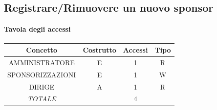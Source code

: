 \documentclass[a4paper,12pt]{report}
\begin{document}
\subsection{Registrare/Rimuovere un nuovo sponsor}
\begin{table}[H]
    \paragraph{Tavola degli accessi\newline}
    \begin{tabular}{|c|c|c|c|}
    \hline
    Concetto          & Costrutto & Accessi & Tipo \\ \hline
    AMMINISTRATORE    & E         & 1       & R    \\ \hline
    SPONSORIZZAZIONI  & E         & 1       & W    \\ \hline
    DIRIGE            & A         & 1       & R    \\ \hline
    \textit{TOTALE}   &           & 4       &      \\ \hline
    \end{tabular}
\end{table}
\end{document}
